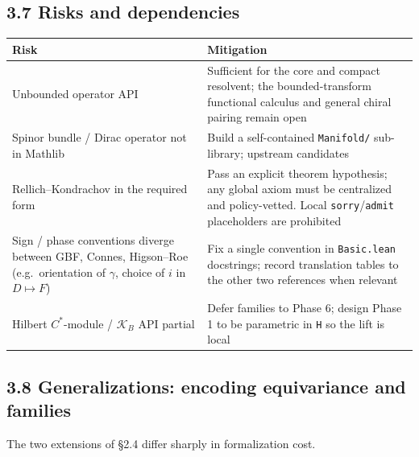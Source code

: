 \documentclass[
  11pt,
]{article}
\newcounter{none} %
\begin{document}
\subsection{3.7 Risks and dependencies}\label{risks-and-dependencies}

{\def\LTcaptype{none} %
\begin{longtable}[]{@{}
  >{\raggedright\arraybackslash}p{}
  >{\raggedright\arraybackslash}p{}@{}}
\toprule\noalign{}
\begin{minipage}[b]{\linewidth}\raggedright
Risk
\end{minipage} & \begin{minipage}[b]{\linewidth}\raggedright
Mitigation
\end{minipage} \\
\midrule\noalign{}
\endhead
\bottomrule\noalign{}
\endlastfoot
Unbounded operator API & Sufficient for the core and compact resolvent;
the bounded-transform functional calculus and general chiral pairing
remain open \\
Spinor bundle / Dirac operator not in Mathlib & Build a self-contained
\texttt{Manifold/} sub-library; upstream candidates \\
Rellich--Kondrachov in the required form & Pass an explicit theorem
hypothesis; any global axiom must be centralized and policy-vetted.
Local \texttt{sorry}/\texttt{admit} placeholders are prohibited \\
Sign / phase conventions diverge between GBF, Connes, Higson--Roe
(e.g.~orientation of \(\gamma\), choice of \(i\) in \(D \mapsto F\)) &
Fix a single convention in \texttt{Basic.lean} docstrings; record
translation tables to the other two references when relevant \\
Hilbert \(C^*\)-module / \(\mathcal{K}_B\) API partial & Defer families
to Phase 6; design Phase 1 to be parametric in \texttt{H} so the lift is
local \\
\end{longtable}
}

\subsection{3.8 Generalizations: encoding equivariance and
families}\label{generalizations-encoding-equivariance-and-families}

The two extensions of §2.4 differ sharply in formalization cost.
\end{document}
